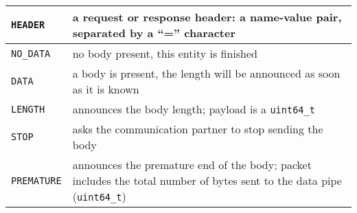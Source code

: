 \documentclass[a4paper,12pt]{article}
\begin{document}
\begin{longtable}{|l|p{10cm}|}
\hline

\texttt{HEADER} & a request or response header: a name-value pair,
separated by a ``='' character \\

\hline

\texttt{NO\_DATA} & no body present, this entity is finished \\

\hline

\texttt{DATA} & a body is present, the length will be announced as
soon as it is known \\

\hline

\texttt{LENGTH} & announces the body length; payload is a
\texttt{uint64\_t} \\

\hline

\texttt{STOP} & asks the communication partner to stop sending the
body \\

\hline

\texttt{PREMATURE} & announces the premature end of the body; packet
includes the total number of bytes sent to the data pipe
(\texttt{uint64\_t}) \\

\hline
\end{longtable}
\end{document}
